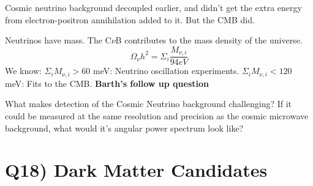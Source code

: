 \documentclass[\main/main.tex]{subfiles}
\begin{document}
    Cosmic neutrino background decoupled earlier, and didn't get the extra energy from electron-positron annihilation added to it. But the CMB did.
    
    Neutrinos have mass. The C$\nu$B contributes to the mass density of the universe.
    \begin{equation}
        \Omega_\nu h^2 = \Sigma_i \frac{M_{\nu,i}}{94 eV}
    \end{equation}
    We know:
    $\Sigma_i M_{\nu,i} > 60$ meV: Neutrino oscillation experiments. 
    $\Sigma_i M_{\nu,i} < 120$ meV: Fits to the CMB.
    \textbf{Barth's follow up question}
    \par
    What makes detection of the Cosmic Neutrino background challenging? If it could be measured at the same resolution and precision as the cosmic microwave background, what would it’s angular power spectrum look like?



\newpage
\section{Q18) Dark Matter Candidates} %
\label{sec:q18_dark_matter_candidates}


	

	



\end{document}
